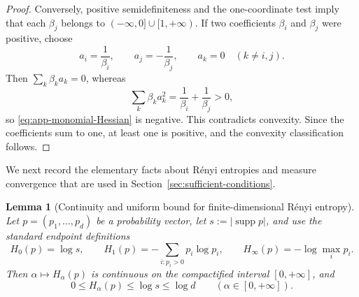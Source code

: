 \documentclass[aps,pra,11pt,onecolumn,nofootinbib,tightenlines]{revtex4-2}
\newtheorem{lemma}[theorem]{Lemma}
\theoremstyle{definition}
\begin{document}
\begin{proof}
Conversely, positive semidefiniteness and the one-coordinate test imply that each $\beta_j$ belongs to $(-\infty,0]\cup[1,+\infty)$.  If two coefficients $\beta_i$ and $\beta_j$ were positive, choose
\begin{equation}
 a_i=\frac1{\beta_i},
 \qquad
 a_j=-\frac1{\beta_j},
 \qquad
 a_k=0\quad(k\neq i,j).
 \label{eq:app-two-positive-test}
\end{equation}
Then $\sum_k\beta_ka_k=0$, whereas
\begin{equation}
 \sum_k\beta_ka_k^2=\frac1{\beta_i}+\frac1{\beta_j}>0,
 \label{eq:app-two-positive-test-value}
\end{equation}
so \eqref{eq:app-monomial-Hessian} is negative.  This contradicts convexity.  Since the coefficients sum to one, at least one is positive, and the convexity classification follows.
\end{proof}

We next record the elementary facts about R\'enyi entropies and measure convergence that are used in Section~\ref{sec:sufficient-conditions}.

\begin{lemma}[Continuity and uniform bound for finite-dimensional R\'enyi entropy]
\label{lem:app-renyi-continuity}
Let $p=(p_1,\ldots,p_d)$ be a probability vector, let $s:=|\operatorname{supp}p|$, and use the standard endpoint definitions
\begin{equation}
 H_0(p)=\log s,
 \qquad
 H_1(p)=-\sum_{i:p_i>0}p_i\log p_i,
 \qquad
 H_\infty(p)=-\log\max_i p_i.
 \label{eq:app-renyi-endpoints}
\end{equation}
Then $\alpha\mapsto H_\alpha(p)$ is continuous on the compactified interval $[0,+\infty]$, and
\begin{equation}
 0\leq H_\alpha(p)\leq\log s\leq\log d
 \qquad(\alpha\in[0,+\infty]).
 \label{eq:app-renyi-bound}
\end{equation}
\end{lemma}
\end{document}
